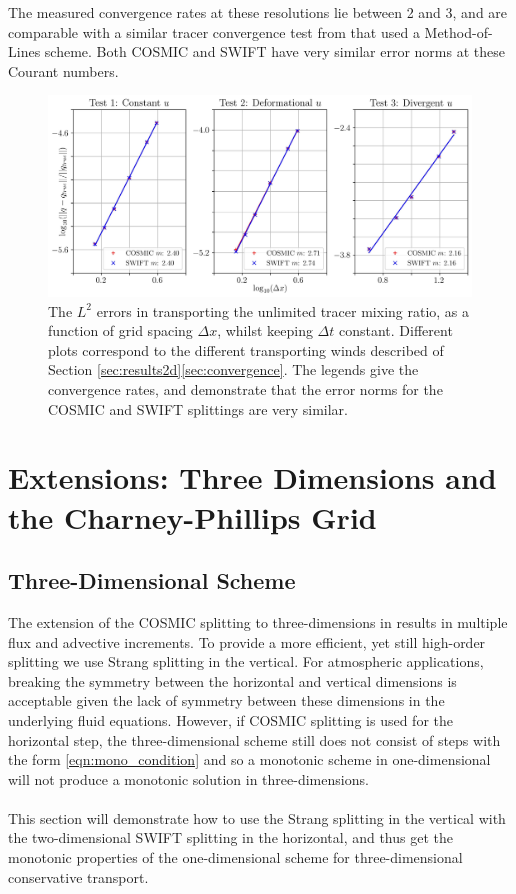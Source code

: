 \documentclass{ametsocV6.1}
\begin{document}
The measured convergence rates at these resolutions lie between 2 and 3, and are comparable with a similar tracer convergence test from \citet{bendall2023solution} that used a Method-of-Lines scheme.
Both COSMIC and SWIFT have very similar error norms at these Courant numbers.
\begin{figure}[h!]
\centering
\includegraphics[width=\textwidth]{fig_6_convergence.jpg}
\caption{The $L^2$ errors in transporting the unlimited tracer mixing ratio, as a function of grid spacing $\Delta x$, whilst keeping $\Delta t$ constant.
Different plots correspond to the different transporting winds described of Section \ref{sec:results2d}\ref{sec:convergence}.
The legends give the convergence rates, and demonstrate that the error norms for the COSMIC and SWIFT splittings are very similar.
}
\label{fig:convergence_const_dt}
\end{figure}

\section{Extensions: Three Dimensions and the Charney-Phillips Grid} \label{sec:3D_CP}
\subsection{Three-Dimensional Scheme} \label{sec:3D}
The extension of the COSMIC splitting to three-dimensions in \cite{leonard1996cosmic} results in multiple flux and advective increments.
To provide a more efficient, yet still high-order splitting we use Strang splitting \citep{strang1968spltting} in the vertical.
For atmospheric applications, breaking the symmetry between the horizontal and vertical dimensions is acceptable given the lack of symmetry between these dimensions in the underlying fluid equations.
However, if COSMIC splitting is used for the horizontal step, the three-dimensional scheme still does not consist of steps with the form \eqref{eqn:mono_condition} and so a monotonic scheme in one-dimensional will not produce a monotonic solution in three-dimensions.
\\
\\
This section will demonstrate how to use the Strang splitting in the vertical with the two-dimensional SWIFT splitting in the horizontal, and thus get the monotonic properties of the one-dimensional scheme for three-dimensional conservative transport.
\end{document}
